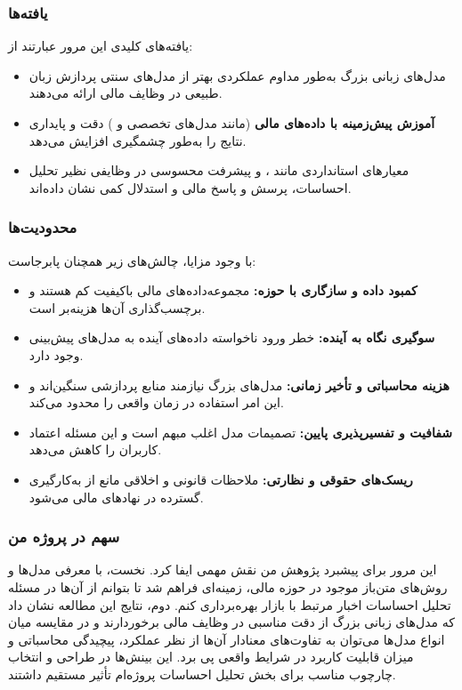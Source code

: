 \documentclass[12pt, a4paper]{report}
\begin{document}
\subsubsection{یافته‌ها}
یافته‌های کلیدی این مرور عبارتند از:
\begin{itemize}
    \item مدل‌های زبانی بزرگ به‌طور مداوم عملکردی بهتر از مدل‌های سنتی پردازش زبان طبیعی در وظایف مالی ارائه می‌دهند.
    \item \textbf{آموزش پیش‌زمینه با داده‌های مالی} (مانند مدل‌های تخصصی  و ) دقت و پایداری نتایج را به‌طور چشمگیری افزایش می‌دهد.
    \item معیارهای استانداردی مانند ،  و  پیشرفت محسوسی در وظایفی نظیر تحلیل احساسات، پرسش و پاسخ مالی و استدلال کمی نشان داده‌اند.
\end{itemize}

\subsubsection{محدودیت‌ها}
با وجود مزایا، چالش‌های زیر همچنان پابرجاست:
\begin{itemize}
    \item \textbf{کمبود داده و سازگاری با حوزه:} مجموعه‌داده‌های مالی باکیفیت کم هستند و برچسب‌گذاری آن‌ها هزینه‌بر است.
    \item \textbf{سوگیری نگاه به آینده:} خطر ورود ناخواسته داده‌های آینده به مدل‌های پیش‌بینی وجود دارد.
    \item \textbf{هزینه محاسباتی و تأخیر زمانی:} مدل‌های بزرگ نیازمند منابع پردازشی سنگین‌اند و این امر استفاده در زمان واقعی را محدود می‌کند.
    \item \textbf{شفافیت و تفسیرپذیری پایین:} تصمیمات مدل اغلب مبهم است و این مسئله اعتماد کاربران را کاهش می‌دهد.
    \item \textbf{ریسک‌های حقوقی و نظارتی:} ملاحظات قانونی و اخلاقی مانع از به‌کارگیری گسترده در نهادهای مالی می‌شود.
\end{itemize}

\subsubsection{سهم در پروژه من}
این مرور برای پیشبرد پژوهش من نقش مهمی ایفا کرد. نخست، با معرفی مدل‌ها و روش‌های متن‌باز موجود در حوزه مالی، زمینه‌ای فراهم شد تا بتوانم از آن‌ها در مسئله تحلیل احساسات اخبار مرتبط با بازار بهره‌برداری کنم. دوم، نتایج این مطالعه نشان داد که مدل‌های زبانی بزرگ از دقت مناسبی در وظایف مالی برخوردارند و در مقایسه میان انواع مدل‌ها می‌توان به تفاوت‌های معنادار آن‌ها از نظر عملکرد، پیچیدگی محاسباتی و میزان قابلیت کاربرد در شرایط واقعی پی برد. این بینش‌ها در طراحی و انتخاب چارچوب مناسب برای بخش تحلیل احساسات پروژه‌ام تأثیر مستقیم داشتند.
\end{document}
